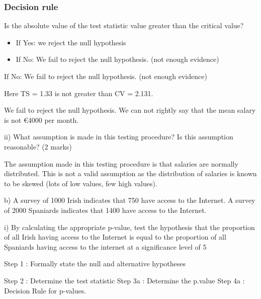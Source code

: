 \documentclass[12pt]{report}
\begin{document}
{\subsubsection{Decision rule}

\begin{framed}
	\noindent Is the absolute value of the test statistic value greater than the critical value?
	\begin{itemize}
		\item If Yes: we reject the null hypothesis
		
		\item If No: We fail to reject the null hypothesis. (not enough evidence)
	\end{itemize}
\end{framed}

If No: We fail to reject the null hypothesis. (not enough evidence)


Here TS = 1.33  is not greater than CV = 2.131.


We fail to reject the null hypothesis. We can not rightly say that the mean salary is not €4000 per month.


ii)      What assumption is made in this testing procedure? Is this assumption reasonable?  (2 marks)

The assumption made in this testing procedure is that salaries are normally distributed.
This is not a valid assumption as the distribution of salaries is known to be skewed (lots of low values, few high values).







b) A survey of 1000 Irish indicates that 750 have access to the Internet. A survey of 2000 Spaniards indicates that 1400 have access to the Internet.

i)        By calculating the appropriate p-value, test the hypothesis that the proportion of all Irish having access to the Internet
is equal to the proportion of all Spaniards having access to the internet at a significance level of 5%



Step 1 : Formally state the null and alternative hypotheses

Step 2 : Determine the test statistic
Step 3a : Determine the p.value
Step 4a : Decision Rule for p-values.



}
\end{document}
